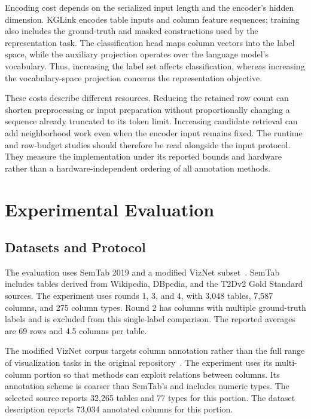 Encoding cost depends on the serialized input length and the encoder's hidden dimension. KGLink encodes table inputs and column feature sequences; training also includes the ground-truth and masked constructions used by the representation task. The classification head maps column vectors into the label space, while the auxiliary projection operates over the language model's vocabulary. Thus, increasing the label set affects classification, whereas increasing the vocabulary-space projection concerns the representation objective.

These costs describe different resources. Reducing the retained row count can shorten preprocessing or input preparation without proportionally changing a sequence already truncated to its token limit. Increasing candidate retrieval can add neighborhood work even when the encoder input remains fixed. The runtime and row-budget studies should therefore be read alongside the input protocol. They measure the implementation under its reported bounds and hardware rather than a hardware-independent ordering of all annotation methods.

\section{Experimental Evaluation}
\label{sec:kglink:experiments}

\subsection{Datasets and Protocol}
\label{sec:kglink:protocol}

The evaluation uses SemTab 2019 and a modified VizNet subset~\cite{kglink-hassanzadeh_oktie_2019_3518539,kglink-zhang2020sato}. SemTab includes tables derived from Wikipedia, DBpedia, and the T2Dv2 Gold Standard sources. The experiment uses rounds 1, 3, and 4, with 3,048 tables, 7,587 columns, and 275 column types. Round 2 has columns with multiple ground-truth labels and is excluded from this single-label comparison. The reported averages are 69 rows and 4.5 columns per table.

The modified VizNet corpus targets column annotation rather than the full range of visualization tasks in the original repository~\cite{kglink-hu2019viznet}. The experiment uses its multi-column portion so that methods can exploit relations between columns. Its annotation scheme is coarser than SemTab's and includes numeric types. The selected source reports 32,265 tables and 77 types for this portion. The dataset description reports 73,034 annotated columns for this portion.


